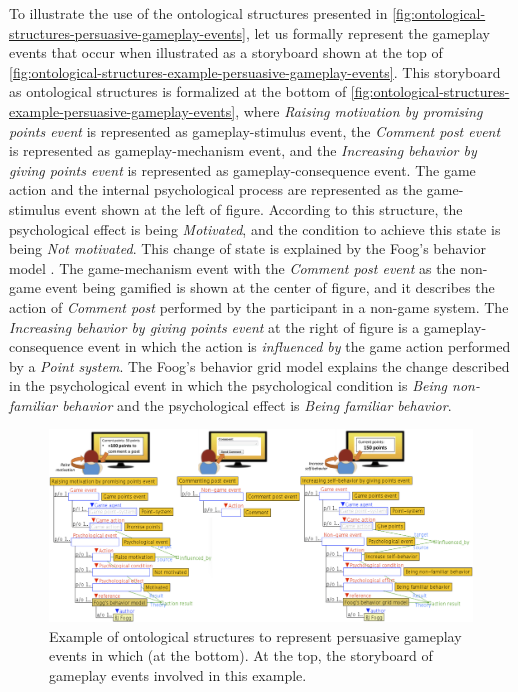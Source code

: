 To illustrate the use of the ontological structures presented in \autoref{fig:ontological-structures-persuasive-gameplay-events}, let us formally represent the gameplay events that occur when  illustrated as a storyboard shown at the top of \autoref{fig:ontological-structures-example-persuasive-gameplay-events}. This storyboard as ontological structures is formalized at the bottom of \autoref{fig:ontological-structures-example-persuasive-gameplay-events}, where \emph{Raising motivation by promising points event} is represented as gameplay-stimulus event, the \emph{Comment post event} is represented as gameplay-mechanism event, and the \emph{Increasing behavior by giving points event} is represented as gameplay-consequence event. The game action  and the internal psychological process  are represented as the game-stimulus event  shown at the left of figure. According to this structure, the psychological effect is being \emph{Motivated}, and the condition to achieve this state is being \emph{Not motivated}. This change of state is explained by the Foog's behavior model \cite{Fogg2009}. The game-mechanism event with the \emph{Comment post event} as the non-game event being gamified is shown at the center of figure, and it describes the action of \emph{Comment post} performed by the participant in a non-game system. The \emph{Increasing behavior by giving points event} at the right of figure is a gameplay-consequence event in which the action  is \emph{influenced by} the game action  performed by a \emph{Point system}. The Foog's behavior grid model explains the change described in the psychological event in which the psychological condition is \emph{Being non-familiar behavior} and the psychological effect is \emph{Being familiar behavior}.

\begin{figure}[!htb]
 \caption[Example of ontological structures to represent persuasive gameplay events]{Example of ontological structures to represent persuasive gameplay events in which   (at the bottom). At the top, the storyboard of gameplay events involved in this example.}
 \label{fig:ontological-structures-example-persuasive-gameplay-events}
 \centering
 \includegraphics[width=1\textwidth]{images/chap-ontogacles2/ontological-structures-example-persuasive-gameplay-events.png}
 \fautor
\end{figure}

